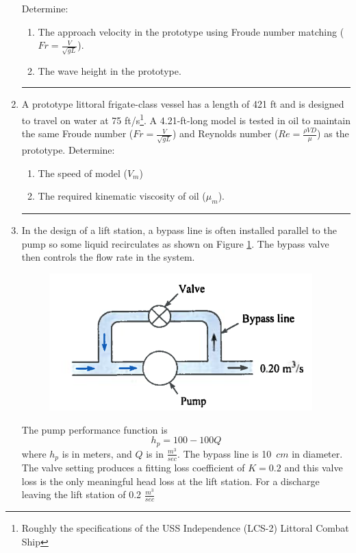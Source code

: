 \documentclass[12pt]{article}
\begin{document}
\begin{enumerate}
Determine:
\begin{enumerate}
\item The approach velocity in the prototype using Froude number matching ($Fr = \frac{V}{\sqrt{gL}}$).
\item The wave height in the prototype.
\end{enumerate}
\noindent\rule{\linewidth}{0.4pt}
\clearpage
\item A prototype littoral frigate-class vessel has a length of 421 ft and is designed to travel on water at 75 ft/s\footnote{Roughly the specifications of the USS Independence (LCS-2) Littoral Combat Ship}. A 4.21-ft-long model is tested in oil to maintain the same Froude number ($Fr = \frac{V}{\sqrt{gL}}$) and Reynolds number ($Re = \frac{\rho V D}{\mu}$) as the prototype. Determine:
\begin{enumerate}
\item The speed of model ($V_m$) 
\item The required kinematic viscosity of oil ($\mu_m$). 
\end{enumerate}

\noindent\rule{\linewidth}{0.4pt}
\clearpage
\item In the design of a lift station, a bypass line is often installed parallel to the pump so some liquid recirculates as shown on Figure \ref{fig:pump-bypass}. The bypass valve then controls the flow rate in the system.

\begin{figure}[h!] %
   \centering
   \includegraphics[width=4in]{pump-bypass.png} 
   \caption{}
   \label{fig:pump-bypass}
\end{figure}

The pump performance function is $$h_p = 100 - 100Q$$ where $h_p$ is in meters, and $Q$ is in $\frac{m^3}{sec}$. 
The bypass line is 10~$cm$ in diameter.  The valve setting produces a fitting loss coefficient of $K=0.2$ and this valve loss is the only meaningful head loss at the lift station.  
For a discharge leaving the lift station of 0.2 $\frac{m^3}{sec}$ 


\end{enumerate}
\end{document}
